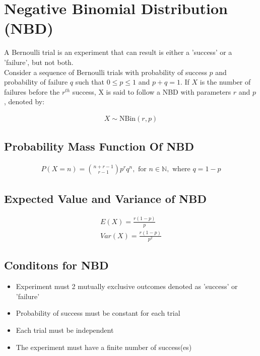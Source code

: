 \documentclass{article}
\begin{document}
\section{Negative Binomial Distribution (NBD)}
A Bernoulli trial is an experiment that can result is either a
'success' or a 'failure', but not both. \\

Consider a sequence of Bernoulli trials with probability of success
$ p $ and probability of failure $ q $ such that $ 0 \leq p \leq 1 $
and $ p + q = 1 $. If $ X $ is the number of failures before the
$ r^{th} $ success, X is said to follow a NBD with parameters $ r $
and $ p $, denoted by:

\begin{gather*}
  X \sim \text{NBin}(r, p)
\end{gather*}

\subsection{Probability Mass Function Of NBD}

\begin{gather*}
  P(X = n) = {{n + r - 1} \choose {r - 1}} p^r q^n, 
  \text{ for } n \in \mathbb{N}, \text{ where } q = 1-p
\end{gather*}

\subsection{Expected Value and Variance of NBD}
\begin{gather*}
  E(X) = \frac{r(1-p)}{p} \\[5pt]
  Var(X) = \frac{r(1-p)}{p^2}
\end{gather*}

\subsection{Conditons for NBD}
\begin{itemize}
  \item Experiment must 2 mutually exclusive outcomes denoted as
    'success' or 'failure'
  \item Probability of success must be constant for each trial
  \item Each trial must be independent
  \item The experiment must have a finite number of success(es)
\end{itemize}
\end{document}
